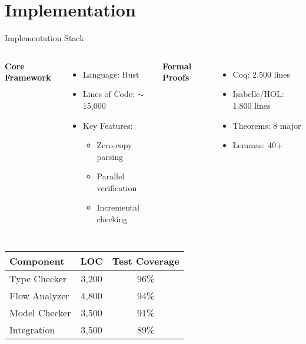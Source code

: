 \documentclass[aspectratio=169,xcolor=dvipsnames]{beamer}
\begin{document}
\section{Implementation}

\begin{frame}{Implementation Stack}
\begin{columns}[T]
\textbf{Core Framework}
\begin{itemize}
    \item Language: Rust
    \item Lines of Code: $\sim$15,000
    \item Key Features:
    \begin{itemize}
        \item Zero-copy parsing
        \item Parallel verification
        \item Incremental checking
    \end{itemize}
\end{itemize}

\textbf{Formal Proofs}
\begin{itemize}
    \item Coq: 2,500 lines
    \item Isabelle/HOL: 1,800 lines
    \item Theorems: 8 major
    \item Lemmas: 40+
\end{itemize}
\end{columns}

\vspace{1em}
\begin{center}
\begin{tabular}{lcc}
\toprule
\textbf{Component} & \textbf{LOC} & \textbf{Test Coverage} \\
\midrule
Type Checker & 3,200 & 96\% \\
Flow Analyzer & 4,800 & 94\% \\
Model Checker & 3,500 & 91\% \\
Integration & 3,500 & 89\% \\
\bottomrule
\end{tabular}
\end{center}
\end{frame}

\end{document}
